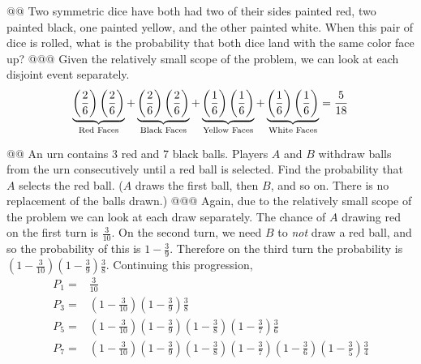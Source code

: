 \documentclass[10pt]{article}
\begin{document}
\begin{easylist}[enumerate]
    @@ Two symmetric dice have both had two of their sides painted red, two painted black, one painted yellow, and the other painted white. When this pair of dice is rolled, what is the probability that both dice land with the same color face up?
    @@@ Given the relatively small scope of the problem, we can look at each disjoint event separately.
        \[
            \underbrace{%
                \left( \frac{2}{6} \right)
                \left( \frac{2}{6} \right)
            }_{\text{Red Faces}}
            +
            \underbrace{%
            \left( \frac{2}{6} \right)
            \left( \frac{2}{6} \right)
            }_{\text{Black Faces}}
            +
            \underbrace{%
            \left( \frac{1}{6} \right)
            \left( \frac{1}{6} \right)
            }_{\text{Yellow Faces}}
            +
            \underbrace{%
            \left( \frac{1}{6} \right)
            \left( \frac{1}{6} \right)
            }_{\text{White Faces}}
            =
            \frac{5}{18}
        \]

    @@ An urn contains 3 red and 7 black balls. Players $A$ and $B$ withdraw balls from the urn consecutively until a red ball is selected. Find the probability that $A$ selects the red ball. ($A$ draws the first ball, then $B$, and so on. There is no replacement of the balls drawn.)
    @@@ Again, due to the relatively small scope of the problem we can look at each draw separately. The chance of $A$ drawing red on the first turn is $\frac{3}{10}$. On the second turn, we need $B$ to \textit{not} draw a red ball, and so the probability of this is $1 - \frac{3}{9}$. Therefore on the third turn the probability is $\left( 1 - \frac{3}{10}\right) \left(1 - \frac{3}{9} \right) \frac{3}{8}$. Continuing this progression,
        \[
            \begin{aligned}
                P_1 =& \frac{3}{10}\\
                P_3 =& \left( 1 - \frac{3}{10}\right) \left(1 - \frac{3}{9} \right) \frac{3}{8}\\
                P_5 =& \left( 1 - \frac{3}{10}\right) \left(1 - \frac{3}{9} \right) \left( 1 - \frac{3}{8} \right) \left( 1 - \frac{3}{7} \right) \frac{3}{6}\\
                P_7 =& \left( 1 - \frac{3}{10}\right) \left(1 - \frac{3}{9} \right) \left( 1 - \frac{3}{8} \right) \left( 1 - \frac{3}{7} \right) \left( 1 - \frac{3}{6}\right) \left(1 - \frac{3}{5} \right) \frac{3}{4}\\
            \end{aligned}
        \]


\end{easylist}
\end{document}
